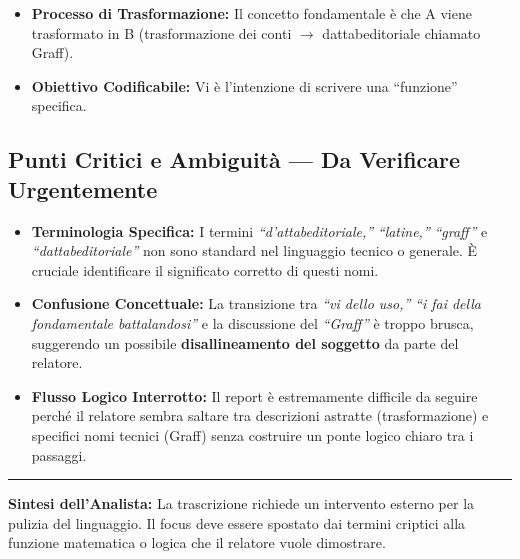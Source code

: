 \documentclass[12pt, a4paper]{article}
\begin{document}
\begin{itemize}[leftmargin=1.5cm]
  \item \textbf{Processo di Trasformazione:} Il concetto fondamentale è che A viene trasformato in B (trasformazione dei conti $\rightarrow$ dattabeditoriale chiamato Graff).
  \item \textbf{Obiettivo Codificabile:} Vi è l'intenzione di scrivere una ``funzione'' specifica.
\end{itemize}

\subsection{\textcolor{alertred}{Punti Critici e Ambiguità — Da Verificare Urgentemente}}

\begin{itemize}[leftmargin=1.5cm]
  \item \textbf{Terminologia Specifica:} I termini \textit{``d'attabeditoriale,''} \textit{``latine,''} \textit{``graff''} e \textit{``dattabeditoriale''} non sono standard nel linguaggio tecnico o generale. È cruciale identificare il significato corretto di questi nomi.
  \item \textbf{Confusione Concettuale:} La transizione tra \textit{``vi dello uso,''} \textit{``i fai della fondamentale battalandosi''} e la discussione del \textit{``Graff''} è troppo brusca, suggerendo un possibile \textbf{disallineamento del soggetto} da parte del relatore.
  \item \textbf{Flusso Logico Interrotto:} Il report è estremamente difficile da seguire perché il relatore sembra saltare tra descrizioni astratte (trasformazione) e specifici nomi tecnici (Graff) senza costruire un ponte logico chiaro tra i passaggi.
\end{itemize}

\vspace{0.8cm}
\noindent\rule{\textwidth}{0.4pt}

\vspace{0.3cm}
\noindent\textbf{Sintesi dell'Analista:} La trascrizione richiede un intervento esterno per la pulizia del linguaggio. Il focus deve essere spostato dai termini criptici alla funzione matematica o logica che il relatore vuole dimostrare.
\end{document}
